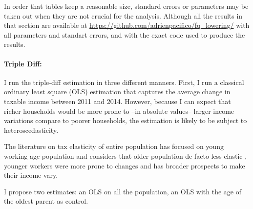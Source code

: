 In order that tables keep a reasonable size, standard errors or parameters may be taken out when they are not crucial for the analysis.  Although all the results in that section are available at \url{https://github.com/adrienpacifico/fq_lowering/} with all parameters and standart errors, and with the exact code used to produce the results.






\paragraph{Triple Diff:}
I run the triple-diff estimation in three different manners. First, I run a classical ordinary least square (OLS) estimation that captures the average change in taxable income between 2011 and 2014. However, because I can expect that richer households would be more prone to --in absolute values-- larger income variations compare to poorer households,  the estimation is likely to be subject to heteroscedasticity. 



The literature on tax elasticity of entire population has focused on young working-age population and considers that older population de-facto less elastic \citep{alpert2013estimating, messacar2017incidence}, younger workers were more prone to changes and has broader prospects to make their income vary. 

\medskip

I propose two estimates: an OLS on all the population, an OLS with the age of the oldest parent as control.



